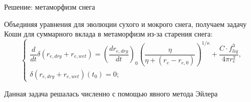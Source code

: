 \documentclass[unicode]{beamer}
\begin{document}
\begin{frame}{Решение: метаморфизм снега}

\footnotesize

Объединяя уравнения для эволюции сухого и мокрого снега, получаем задачу Коши для суммарного вклада в метаморфизм из-за старения снега:
    \[ \begin{cases}
        \dfrac{d}{dt} \delta (r_{e , dry} + r_{e , wet}) = {\left( \dfrac{dr_{e , dry}}{dt} \right)}_0 \left(\dfrac{\eta}{\eta + (r_e - r_{e, 0})}\right)^{1 / \kappa} + \dfrac{C \cdot f_{liq}^3} {4 \pi r_{e}^2} ,
        \\
        \delta (r_{e , dry} + r_{e , wet})(t_0) = 0; 
    \end{cases} \]

Данная задача решалась численно с помощью явного метода Эйлера

\end{frame}
\end{document}
